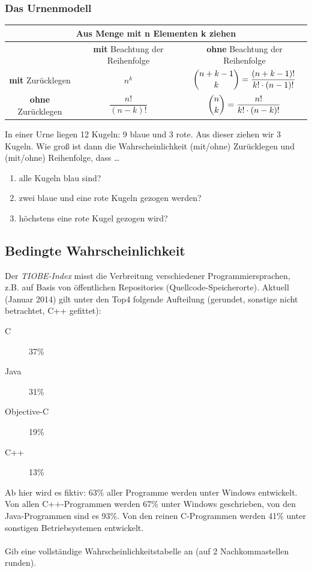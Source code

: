 \documentclass[11pt, a4paper]{article}
\begin{document}
\subsubsection{Das Urnenmodell}
\begin{tabular}{|c|c|c|}
	\hline
	\multicolumn{3}{|c|}{Aus Menge mit \textbf{n} Elementen \textbf{k} ziehen} \\
	\hline
	 & \textbf{mit} Beachtung der Reihenfolge & \textbf{ohne} Beachtung der Reihenfolge \\
	\hline
	\textbf{mit} Zurücklegen & $n^k$ & $\dbinom{n+k-1}{k} = \dfrac{(n+k-1)!}{k!\cdot (n-1)!}$ \\
	\hline
	\textbf{ohne} Zurücklegen & $\dfrac{n!}{(n-k)!}$ & $\dbinom{n}{k} = \dfrac{n!}{k!\cdot (n-k)!}$ \\
	\hline
\end{tabular}

In einer Urne liegen 12 Kugeln: 9 blaue und 3 rote. Aus dieser ziehen wir 3 Kugeln. Wie groß ist dann die Wahrscheinlichkeit (mit/ohne) Zurücklegen und (mit/ohne) Reihenfolge, dass \dots
\begin{enumerate}
	\item alle Kugeln blau sind?
	\item zwei blaue und eine rote Kugeln gezogen werden?
	\item höchstens eine rote Kugel gezogen wird?
\end{enumerate}

\subsection{Bedingte Wahrscheinlichkeit}
Der \textit{TIOBE-Index} misst die Verbreitung verschiedener Programmiersprachen, z.B. auf Basis von öffentlichen Repositories (Quellcode-Speicherorte). Aktuell (Januar 2014) gilt unter den Top4 folgende Aufteilung (gerundet, sonstige nicht betrachtet, C++ gefittet):
\begin{description}
	\item[C] 37\%
	\item[Java] 31\%
	\item[Objective-C] 19\%
	\item[C++] 13\%
\end{description}
Ab hier wird es fiktiv: 63\% aller Programme werden unter Windows entwickelt. Von allen C++-Programmen werden 67\% unter Windows geschrieben, von den Java-Programmen sind es 93\%. Von den reinen C-Programmen werden 41\% unter sonstigen Betriebsystemen entwickelt. \\
\\
Gib eine vollständige Wahrscheinlichkeitstabelle an (auf 2 Nachkommastellen runden).
\end{document}
